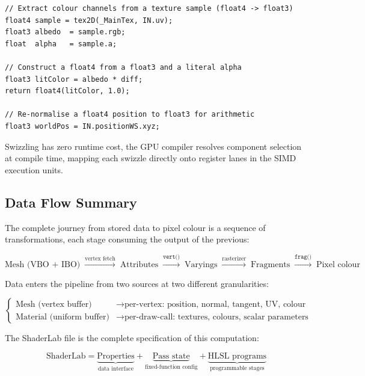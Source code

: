\documentclass[11pt]{article}
\begin{document}
\begin{lstlisting}
// Extract colour channels from a texture sample (float4 -> float3)
float4 sample = tex2D(_MainTex, IN.uv);
float3 albedo  = sample.rgb;
float  alpha   = sample.a;

// Construct a float4 from a float3 and a literal alpha
float3 litColor = albedo * diff;
return float4(litColor, 1.0);

// Re-normalise a float4 position to float3 for arithmetic
float3 worldPos = IN.positionWS.xyz;
\end{lstlisting}

Swizzling has zero runtime cost, the GPU compiler resolves component selection at compile time, mapping each swizzle directly onto register lanes in the SIMD execution units.


\subsection{Data Flow Summary}

The complete journey from stored data to pixel colour is a sequence of transformations, each stage consuming the output of the previous:

\begin{equation}
    \text{Mesh (VBO + IBO)}
    \;\xrightarrow{\text{vertex fetch}}\;
    \text{Attributes}
    \;\xrightarrow{\texttt{vert()}}\;
    \text{Varyings}
    \;\xrightarrow{\text{rasterizer}}\;
    \text{Fragments}
    \;\xrightarrow{\texttt{frag()}}\;
    \text{Pixel colour}
\end{equation}

Data enters the pipeline from two sources at two different granularities:

\begin{equation}
    \begin{cases}
        \text{Mesh (vertex buffer)} & \rightarrow \text{per-vertex: position, normal, tangent, UV, colour} \\
        \text{Material (uniform buffer)} & \rightarrow \text{per-draw-call: textures, colours, scalar parameters}
    \end{cases}
\end{equation}

The ShaderLab file is the complete specification of this computation:

\begin{equation}
    \text{ShaderLab} =
    \underbrace{\text{Properties}}_{\text{data interface}}
    +
    \underbrace{\text{Pass state}}_{\text{fixed-function config}}
    +
    \underbrace{\text{HLSL programs}}_{\text{programmable stages}}
\end{equation}
\end{document}
